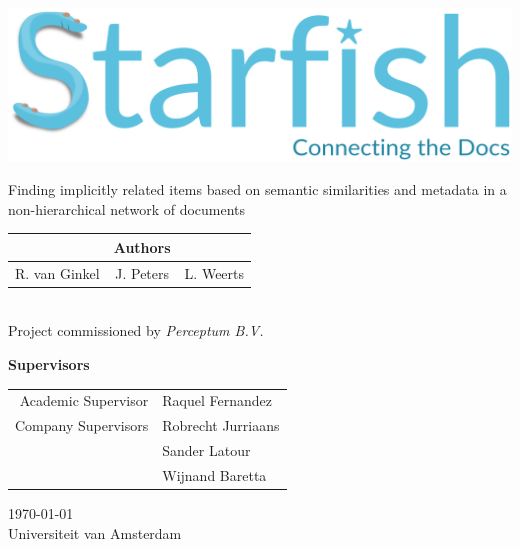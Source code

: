 \documentclass[a4paper]{article}
\begin{document}
\thispagestyle{empty}
\begin{center}
\includegraphics[width=\linewidth]{logo_starfish_project}\\\vspace{1cm}

{\large
Finding implicitly related items based on semantic similarities and metadata in a non-hierarchical network of documents
}\\\vspace{0.5cm}

\begin{tabular*}{0.8\linewidth}{@{\extracolsep{\fill}}lcr}
& \textbf{Authors} & \\
\hline
R. van Ginkel 	& J. Peters 	& L. Weerts \\
\end{tabular*}
\\\vspace{2cm}
Project commissioned by \emph{Perceptum B.V.}\\\vspace{1cm}

\textbf{Supervisors}\\
\begin{tabular}{r|l}
Academic Supervisor & Raquel Fernandez \\
Company Supervisors & Robrecht Jurriaans \\
& Sander Latour \\
& Wijnand Baretta
\end{tabular}


\vfill
\today\\
Universiteit van Amsterdam

\end{center}
\restoregeometry

\clearpage
\end{document}
